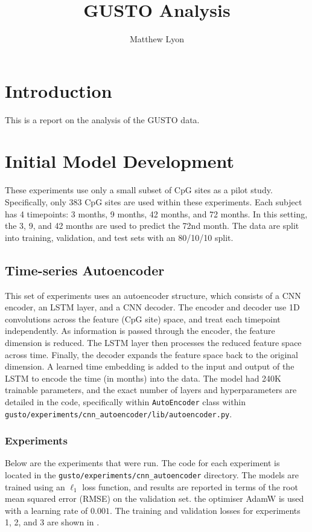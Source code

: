 \documentclass[twocolumn, 9pt]{extarticle}
\begin{document}
\title{GUSTO Analysis}

\author{Matthew Lyon}

\date{}
\maketitle

\section{Introduction}

This is a report on the analysis of the GUSTO data.

\section{Initial Model Development} \label{sec:initial_model}

These experiments use only a small subset of CpG sites as a pilot study. Specifically, only 383 CpG sites are used within these experiments. Each subject has 4 timepoints: 3 months, 9 months, 42 months, and 72 months. In this setting, the 3, 9, and 42 months are used to predict the 72nd month. The data are split into training, validation, and test sets with an 80/10/10 split.

\subsection{Time-series Autoencoder}

This set of experiments uses an autoencoder structure, which consists of a CNN encoder, an LSTM layer, and a CNN decoder. The encoder and decoder use 1D convolutions across the feature (CpG site) space, and treat each timepoint independently. As information is passed through the encoder, the feature dimension is reduced. The LSTM layer then processes the reduced feature space across time. Finally, the decoder expands the feature space back to the original dimension. A learned time embedding is added to the input and output of the LSTM to encode the time (in months) into the data. The model had 240K trainable parameters, and the exact number of layers and hyperparameters are detailed in the code, specifically within \texttt{AutoEncoder} class within \texttt{gusto/experiments/cnn\_autoencoder/lib/autoencoder.py}.

\subsubsection{Experiments}
Below are the experiments that were run. The code for each experiment is located in the \texttt{gusto/experiments/cnn\_autoencoder} directory. The models are trained using an $\ell_{1}$ loss function, and results are reported in terms of the root mean squared error (RMSE) on the validation set. the optimiser AdamW is used with a learning rate of $0.001$. The training and validation losses for experiments 1, 2, and 3 are shown in .
\end{document}
